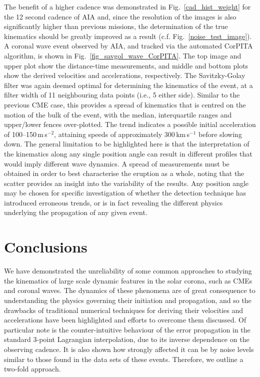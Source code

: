 \documentclass[structabstract]{aa}
\begin{document}
The benefit of a higher cadence was demonstrated in Fig.~\ref{cad_hist_weight} for the 12 second cadence of AIA and, since the resolution of the images is also significantly higher than previous missions, the determination of the true kinematics should be greatly improved as a result (c.f. Fig.~\ref{noise_test_image}). A coronal wave event observed by AIA, and tracked via the automated CorPITA algorithm, is shown in Fig.~\ref{fig_savgol_wave_CorPITA}. The top image and upper plot show the distance-time measurements, and middle and bottom plots show the derived velocities and accelerations, respectively. The Savitzky-Golay filter was again deemed optimal for determining the kinematics of the event, at a filter width of 11 neighbouring data points (i.e., 5 either side). Similar to the previous CME case, this provides a spread of kinematics that is centred on the motion of the bulk of the event, with the median, interquartile ranges and upper/lower fences over-plotted. The trend indicates a possible initial acceleration of 100--150\,m\,s$^{-2}$, attaining speeds of approximately 300\,km\,s$^{-1}$ before slowing down. The general limitation to be highlighted here is that the interpretation of the kinematics along any single position angle can result in different profiles that would imply different wave dynamics. A spread of measurements must be obtained in order to best characterise the eruption as a whole, noting that the scatter provides an insight into the variability of the results. Any position angle may be chosen for specific investigation of whether the detection technique has introduced erroneous trends, or is in fact revealing the different physics underlying the propagation of any given event.


\section{Conclusions}
\label{sect:conclusions}

We have demonstrated the unreliability of some common approaches to studying the kinematics of large scale dynamic features in the solar corona, such as CMEs and coronal waves. The dynamics of these phenomena are of great consequence to understanding the physics governing their initiation and propagation, and so the drawbacks of traditional numerical techniques for deriving their velocities and accelerations have been highlighted and efforts to overcome them discussed. Of particular note is the counter-intuitive behaviour of the error propagation in the standard 3-point Lagrangian interpolation, due to its inverse dependence on the observing cadence. It is also shown how strongly affected it can be by noise levels similar to those found in the data sets of these events. Therefore, we outline a two-fold approach.
\end{document}
